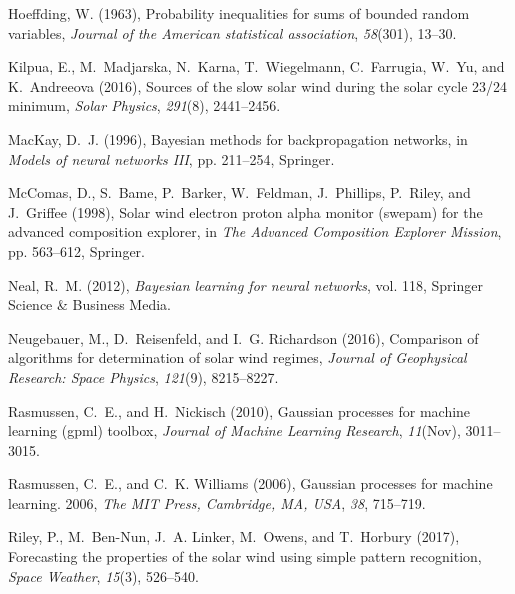 \documentclass[draft,jgrga]{agutex}
\begin{document}
\begin{article}
\begin{thebibliography}{27}
Hoeffding, W. (1963), Probability inequalities for sums of bounded random
  variables, \textit{Journal of the American statistical association},
  \textit{58}(301), 13--30.

Kilpua, E., M.~Madjarska, N.~Karna, T.~Wiegelmann, C.~Farrugia, W.~Yu, and
  K.~Andreeova (2016), Sources of the slow solar wind during the solar cycle
  23/24 minimum, \textit{Solar Physics}, \textit{291}(8), 2441--2456.

MacKay, D.~J. (1996), Bayesian methods for backpropagation networks, in
  \textit{Models of neural networks III}, pp. 211--254, Springer.

McComas, D., S.~Bame, P.~Barker, W.~Feldman, J.~Phillips, P.~Riley, and
  J.~Griffee (1998), Solar wind electron proton alpha monitor (swepam) for the
  advanced composition explorer, in \textit{The Advanced Composition Explorer
  Mission}, pp. 563--612, Springer.

Neal, R.~M. (2012), \textit{Bayesian learning for neural networks}, vol. 118,
  Springer Science \& Business Media.

Neugebauer, M., D.~Reisenfeld, and I.~G. Richardson (2016), Comparison of
  algorithms for determination of solar wind regimes, \textit{Journal of
  Geophysical Research: Space Physics}, \textit{121}(9), 8215--8227.

Rasmussen, C.~E., and H.~Nickisch (2010), Gaussian processes for machine
  learning (gpml) toolbox, \textit{Journal of Machine Learning Research},
  \textit{11}(Nov), 3011--3015.

Rasmussen, C.~E., and C.~K. Williams (2006), Gaussian processes for machine
  learning. 2006, \textit{The MIT Press, Cambridge, MA, USA}, \textit{38},
  715--719.

Riley, P., M.~Ben-Nun, J.~A. Linker, M.~Owens, and T.~Horbury (2017),
  Forecasting the properties of the solar wind using simple pattern
  recognition, \textit{Space Weather}, \textit{15}(3), 526--540.


\end{thebibliography}
\end{article}
\end{document}
